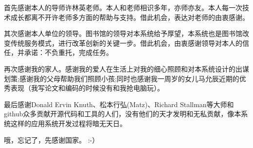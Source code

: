 
\begin{ack}
  首先感谢本人的导师许林英老师。本人和老师相识多年，亦师亦友。本人每一次技术成长都离不开许老师多方面的帮助与支持。借此机会，表达对老师的由衷感谢。

  其次感谢本人单位的领导。图书馆的领导对本系统给予厚望，本系统也是图书馆改变传统服务模式，进行改革创新的关键一步。借此机会，由衷感谢领导对本人的信任，并承诺：不负重托，完成任务。

  再次感谢我的家人。感谢我的爱人在生活上对我的细心照顾和对本系统设计的出谋划策;感谢我的父母帮助我们照顾小孩;同时也感谢我一周岁的女儿马允辰近期的优秀表现（我写论文和编码的时候没有和我抢电脑玩）。

  最后感谢Donald Ervin Knuth、松本行弘(Matz)、Richard Stallman等大师和github众多贡献开源代码和工具的人们，没有他们的天才发明和无私贡献，像本系统这样的应用系统开发过程将暗无天日。

  哦，忘记了，先感谢国家。 :-）
\end{ack}
